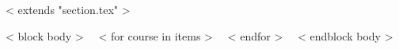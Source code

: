 ~< extends "section.tex" >~

~< block body >~
~< for course in items >~
~< endfor >~
~< endblock body >~
